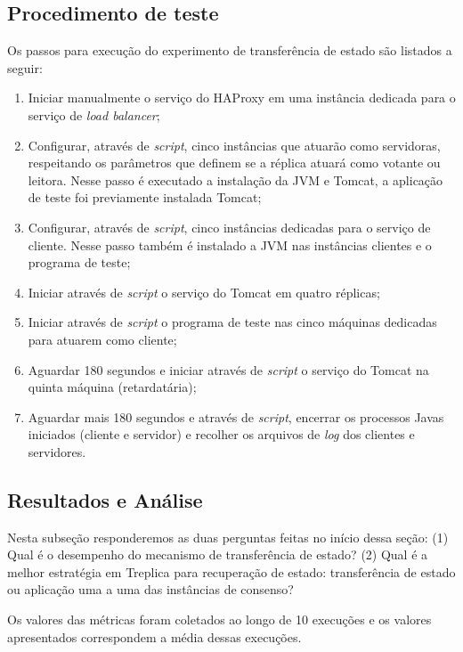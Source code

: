 \subsection{Procedimento de teste}

Os passos para execução do experimento de transferência de estado são listados a seguir:

\begin{enumerate}
  \item Iniciar manualmente o serviço do HAProxy em uma instância dedicada para o serviço
    de \emph{load balancer};
  \item Configurar, através de \emph{script}, cinco instâncias que atuarão como
    servidoras, respeitando os parâmetros que definem se a réplica atuará como votante ou
    leitora. Nesse passo é executado a instalação da JVM e Tomcat, a aplicação de teste
    foi previamente instalada Tomcat;
  \item Configurar, através de \emph{script}, cinco instâncias dedicadas para o serviço de
    cliente. Nesse passo também é instalado a JVM nas instâncias clientes e o programa de
    teste;
  \item Iniciar através de \emph{script} o serviço do Tomcat em quatro réplicas;
  \item Iniciar através de \emph{script} o programa de teste nas cinco máquinas dedicadas
    para atuarem como cliente;
  \item Aguardar 180 segundos e iniciar através de \emph{script} o serviço do Tomcat na
    quinta máquina (retardatária);
  \item Aguardar mais 180 segundos e através de \emph{script}, encerrar os processos Javas
    iniciados (cliente e servidor) e recolher os arquivos de \emph{log} dos clientes e
    servidores.
\end{enumerate}

\subsection{Resultados e Análise}

Nesta subseção responderemos as duas perguntas feitas no início dessa seção: (1) Qual é o
desempenho do mecanismo de transferência de estado? (2) Qual é a melhor estratégia em
Treplica para recuperação de estado: transferência de estado ou aplicação uma a uma das
instâncias de consenso?

Os valores das métricas foram coletados ao longo de 10 execuções e os valores apresentados
correspondem a média dessas execuções.

